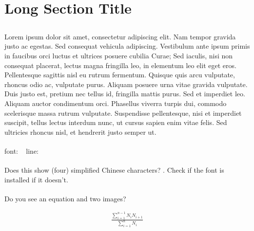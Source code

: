 \documentclass[a4paper,twoside,UTF8]{article}
\begin{document}
	\section[Short Section Title]{Long Section Title}
		\begin{multicols}{2}
		\subsection{}
			\paragraph{}
				Lorem ipsum dolor sit amet, consectetur adipiscing elit. Nam tempor gravida justo ac egestas. Sed consequat vehicula adipiscing. Vestibulum ante ipsum primis in faucibus orci luctus et ultrices posuere cubilia Curae; Sed iaculis, nisi non consequat placerat, lectus magna fringilla leo, in elementum leo elit eget eros. Pellentesque sagittis nisl eu rutrum fermentum. Quisque quis arcu vulputate, rhoncus odio ac, vulputate purus. Aliquam posuere urna vitae gravida vulputate. Duis justo est, pretium nec tellus id, fringilla mattis purus. Sed et imperdiet leo. Aliquam auctor condimentum orci. Phasellus viverra turpis dui, commodo scelerisque massa rutrum vulputate. Suspendisse pellentesque, nisi et imperdiet suscipit, tellus lectus interdum nunc, ut cursus sapien enim vitae felis. Sed ultricies rhoncus nisl, et hendrerit justo semper ut.
			\paragraph{}
				font: \fontname\font\ \the\fontdimen6\font
				line: \prntlen{\textwidth} \prntlen{\linewidth}
			\paragraph{}
				Does this show (four) simplified Chinese characters? . Check if the font is installed if it doesn't.
			\paragraph{}
				Do you see an equation and two images?
		\end{multicols}

		\begin{align}
			\frac{\sum_{i=1}^{n-1}N_{i}N_{i+1}}{\sum_{i=1}^{n} N_{i}}
			\label{eq:equation_label}
		\end{align}
\end{document}
